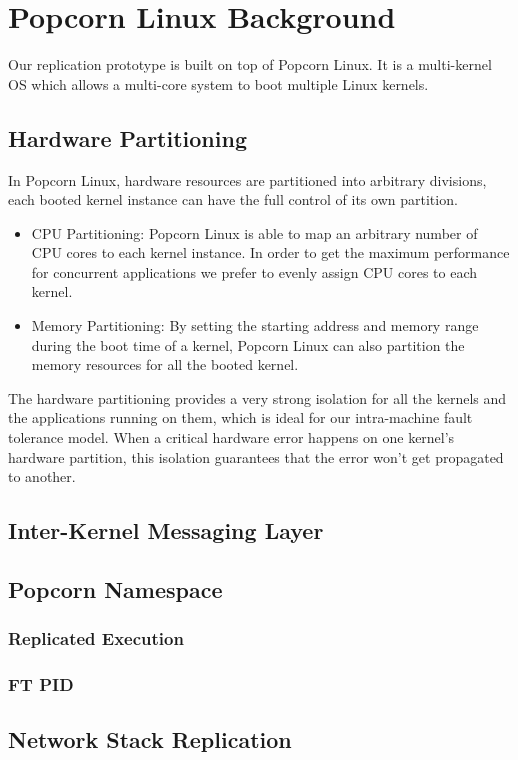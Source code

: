 \chapter{Popcorn Linux Background}
Our replication prototype is built on top of Popcorn Linux. It is a multi-kernel OS which allows a multi-core system to boot multiple Linux kernels.
\section{Hardware Partitioning}
In Popcorn Linux, hardware resources are partitioned into arbitrary divisions, each booted kernel instance can have the full control of its own partition.

\begin{itemize}
\item{CPU Partitioning:} Popcorn Linux is able to map an arbitrary number of CPU cores to each kernel instance. In order to get the maximum performance for concurrent applications we prefer to evenly assign CPU cores to each kernel.

\item{Memory Partitioning:} By setting the starting address and memory range during the boot time of a kernel, Popcorn Linux can also partition the memory resources for all the booted kernel.
\end{itemize}

The hardware partitioning provides a very strong isolation for all the kernels and the applications running on them, which is ideal for our intra-machine fault tolerance model. When a critical hardware error happens on one kernel's hardware partition, this isolation guarantees that the error won't get propagated to another.

\section{Inter-Kernel Messaging Layer}

\section{Popcorn Namespace}
\subsection{Replicated Execution}
\subsection{FT PID}
\section{Network Stack Replication}
